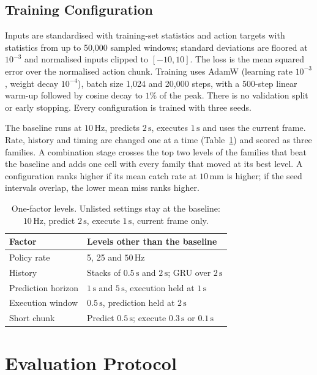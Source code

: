 \documentclass[conference]{IEEEtran}
\begin{document}
\subsection{Training Configuration}
Inputs are standardised with training-set statistics and action targets with statistics from up to 50,000 sampled windows; standard deviations are floored at $10^{-3}$ and normalised inputs clipped to $[-10,10]$. The loss is the mean squared error over the normalised action chunk. Training uses AdamW (learning rate $10^{-3}$, weight decay $10^{-4}$), batch size 1,024 and 20,000 steps, with a 500-step linear warm-up followed by cosine decay to $1\%$ of the peak. There is no validation split or early stopping. Every configuration is trained with three seeds.

The baseline runs at $10\,\mathrm{Hz}$, predicts $2\,\mathrm{s}$, executes $1\,\mathrm{s}$ and uses the current frame. Rate, history and timing are changed one at a time (Table~\ref{tab:factors}) and scored as three families. A combination stage crosses the top two levels of the families that beat the baseline and adds one cell with every family that moved at its best level. A configuration ranks higher if its mean catch rate at $10\,\mathrm{mm}$ is higher; if the seed intervals overlap, the lower mean miss ranks higher.

\begin{table}[t]
\centering
\caption{One-factor levels. Unlisted settings stay at the baseline: $10\,\mathrm{Hz}$, predict $2\,\mathrm{s}$, execute $1\,\mathrm{s}$, current frame only.}
\label{tab:factors}
\footnotesize
\begin{tabular}{lp{5.2cm}}
\toprule
Factor & Levels other than the baseline \\
\midrule
Policy rate & 5, 25 and $50\,\mathrm{Hz}$ \\
History & Stacks of $0.5\,\mathrm{s}$ and $2\,\mathrm{s}$; GRU over $2\,\mathrm{s}$ \\
Prediction horizon & $1\,\mathrm{s}$ and $5\,\mathrm{s}$, execution held at $1\,\mathrm{s}$ \\
Execution window & $0.5\,\mathrm{s}$, prediction held at $2\,\mathrm{s}$ \\
Short chunk & Predict $0.5\,\mathrm{s}$; execute $0.3\,\mathrm{s}$ or $0.1\,\mathrm{s}$ \\
\bottomrule
\end{tabular}
\end{table}

\section{Evaluation Protocol}
\label{sec:eval}
\end{document}
